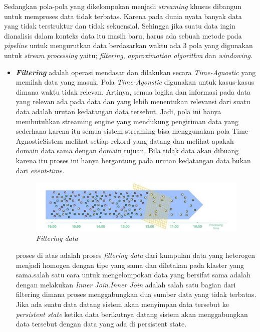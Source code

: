 \documentclass[a4paper,twoside]{article}
\begin{document}
\begin{enumerate}
		Sedangkan pola-pola yang dikelompokan menjadi \textit{streaming} khusus dibangun untuk 					memproses data tidak terbatas. Karena pada dunia nyata banyak data yang tidak terstruktur
		dan tidak sekuensial. Sehingga jika suatu data ingin dianalisis dalam konteks data itu masih 		baru, harus ada sebuah metode pada \textit{pipeline} untuk mengurutkan data berdasarkan 				waktu ada 3 pola yang digunakan untuk \textit{stream processing} yaitu; \textit{filtering},
		\textit{approximation algorithm} dan \textit{windowing}.
		
		\begin{itemize}
			\item{\textit{\textbf{Filtering}} adalah operasi mendasar dan dilakukan secara \textit{Time-Agnostic} yang 
	memilah data yang masuk. Pola \textit{Time-Agonstic} digunakan untuk kasus-kasus dimana waktu 
	tidak relevan. Artinya, semua logika dan informasi pada data yang relevan ada pada data dan 
	yang lebih menentukan relevansi dari suatu data adalah urutan kedatangan data 
	tersebut. Jadi, pola ini hanya membutuhkan streaming engine yang mendukung pengiriman 
	data yang sederhana karena itu semua sistem streaming bisa menggunakan pola Time-
	AgnosticSistem melihat setiap rekord yang datang dan melihat apakah domain data 	
	sama dengan domain tujuan. Bila tidak data akan dibuang karena itu proses ini hanya 			
	bergantung pada urutan kedatangan data bukan dari \textit{event-time}.
	
	\begin{figure}[H] 
	\centering  
	\includegraphics[scale=0.5]{8-Filtering-Unbounded-data}  
	\caption[Gambar {\it Filtering-unbounded-data}]{\textit{Filtering data}} 
	\label{fig:processing-events relationship} 
	\end{figure} 
	
	proses di atas adalah proses \textit{filtering data} dari kumpulan data yang
	heterogen menjadi homogen dengan tipe yang sama dan diletakan pada klaster yang sama.salah
	satu cara untuk mengelompokan data yang bersifat sama adalah dengan melakukan \textit{Inner 
	Join}.\textit{Inner Join} adalah salah satu bagian dari filtering dimana proses menggabungkan 
	dua sumber data yang tidak terbatas. Jika ada suatu data datang sistem akan menyimpan data 
	tersebut ke \textit{persistent state} ketika data berikutnya datang sistem akan 
	menggabungkan data tersebut dengan data yang ada di persistent state.
			}
			

\end{itemize}
\end{enumerate}
\end{document}
